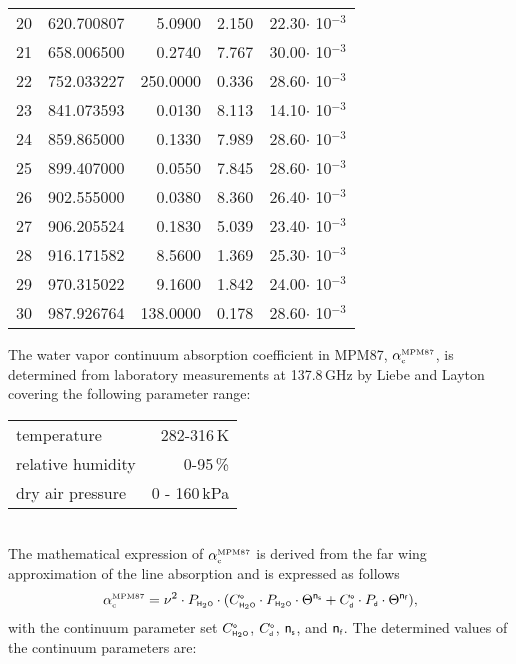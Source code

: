 {\begin{longtable}{rrrrr}
20    &   620.700807&    5.0900&  2.150&   22.30$\cdot$ 10$^{-3}$\\
21    &   658.006500&    0.2740&  7.767&   30.00$\cdot$ 10$^{-3}$\\
22    &   752.033227&  250.0000&  0.336&   28.60$\cdot$ 10$^{-3}$\\
23    &   841.073593&    0.0130&  8.113&   14.10$\cdot$ 10$^{-3}$\\
24    &   859.865000&    0.1330&  7.989&   28.60$\cdot$ 10$^{-3}$\\
25    &   899.407000&    0.0550&  7.845&   28.60$\cdot$ 10$^{-3}$\\
26    &   902.555000&    0.0380&  8.360&   26.40$\cdot$ 10$^{-3}$\\
27    &   906.205524&    0.1830&  5.039&   23.40$\cdot$ 10$^{-3}$\\
28    &   916.171582&    8.5600&  1.369&   25.30$\cdot$ 10$^{-3}$\\
29    &   970.315022&    9.1600&  1.842&   24.00$\cdot$ 10$^{-3}$\\
30    &   987.926764&  138.0000&  0.178&   28.60$\cdot$ 10$^{-3}$\\
\hline
\end{longtable}
%
%
\label{levele:h2o_mpm87_cont}
The water vapor continuum absorption coefficient in MPM87, $\alpha^{\mbox{\rm \tiny MPM87}}_{\mbox{\tiny c}}$, 
is determined from laboratory measurements at 137.8\,GHz by Liebe 
and Layton covering the following parameter range:\\
\begin{tabular}{lr}
temperature          & 282-316\,K\\
relative humidity    & 0-95\,\%\\
dry air pressure     & 0 - 160\,kPa\\ 
\end{tabular}\\
The mathematical expression of $\alpha^{\mbox{\rm \tiny MPM87}}_{\mbox{\tiny c}}$ is derived from the far wing 
approximation of the line absorption and is expressed as follows
\begin{equation} 
  \label{eq:mpm87:cont}
  \alpha^{\mbox{\rm \tiny MPM87}}_{\mbox{\tiny c}} = \nu^2 \cdot P_{\mbox{\tiny \sf H}_{2}\mbox{\tiny \sf O}} \cdot 
                (C^{\mbox{\tiny \sf o}}_{\mbox{\tiny \sf H}_{2}\mbox{\tiny \sf O}} \cdot P_{\mbox{\tiny \sf H}_{2}\mbox{\tiny \sf O}} \cdot \Theta^{{\sf n}_{\mbox{\tiny \sf s}}} + 
                 C^{\mbox{\tiny \sf o}}_{\mbox{\tiny \sf d}} \cdot P_{\mbox{\tiny \sf d}}  \cdot \Theta^{{\sf n}_{\mbox{\tiny \sf f}}}),
\end{equation}
with the continuum parameter set $C^{\mbox{\tiny \sf o}}_{\mbox{\tiny \sf H}_{2}\mbox{\tiny \sf O}}$, $C^{\mbox{\tiny \sf o}}_{\mbox{\tiny \sf d}}$, ${\sf n}_{\mbox{\tiny \sf s}}$, and ${\sf n}_{\mbox{\tiny \sf f}}$. 
The determined values of the continuum parameters are:
}

